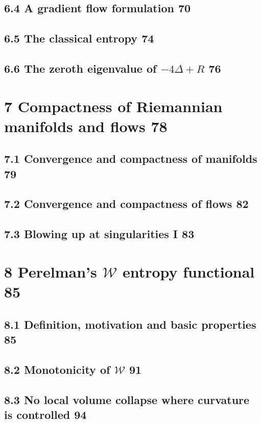 \subsection*{6.4 \quad A gradient flow formulation \hfill 70}
\subsection*{6.5 \quad The classical entropy \hfill 74}
\subsection*{6.6 \quad The zeroth eigenvalue of $-4\Delta + R$ \hfill 76}

\section*{7 \quad Compactness of Riemannian manifolds and flows \hfill 78}
\subsection*{7.1 \quad Convergence and compactness of manifolds \hfill 79}
\subsection*{7.2 \quad Convergence and compactness of flows \hfill 82}
\subsection*{7.3 \quad Blowing up at singularities I \hfill 83}

\section*{8 \quad Perelman's $\mathcal{W}$ entropy functional \hfill 85}
\subsection*{8.1 \quad Definition, motivation and basic properties \hfill 85}
\subsection*{8.2 \quad Monotonicity of $\mathcal{W}$ \hfill 91}
\subsection*{8.3 \quad No local volume collapse where curvature is controlled \hfill 94}
